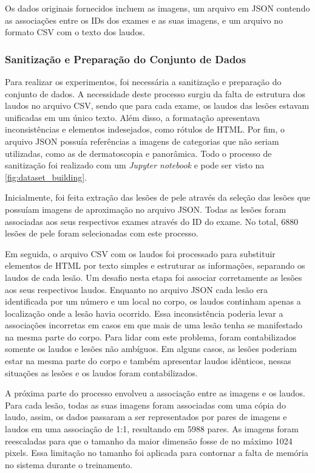 Os dados originais fornecidos incluem as imagens, um arquivo em \ac{JSON} contendo as associações entre os \acp{ID} dos
exames e as suas imagens, e um arquivo no formato \ac{CSV} com o texto dos laudos.

\subsubsection{Sanitização e Preparação do Conjunto de Dados}

Para realizar os experimentos, foi necessária a sanitização e preparação do conjunto de dados. A necessidade deste
processo surgiu da falta de estrutura dos laudos no arquivo \ac{CSV}, sendo que para cada exame, os laudos das
lesões estavam unificadas em um único texto. Além disso, a formatação apresentava inconsistências e elementos
indesejados, como rótulos de \ac{HTML}. Por fim, o arquivo \ac{JSON} possuía referências a imagens de categorias que
não seriam utilizadas, como as de dermatoscopia e panorâmica. Todo o processo de sanitização foi realizado com um
\textit{Jupyter notebook} e pode ser visto na \autoref{fig:dataset_building}.

Inicialmente, foi feita extração das lesões de pele através da seleção das lesões que possuíam imagens de aproximação
no arquivo \ac{JSON}. Todas as lesões foram associadas aos seus respectivos exames através do \ac{ID} do exame. No
total, 6880 lesões de pele foram selecionadas com este processo.

Em seguida, o arquivo \ac{CSV} com os laudos foi processado para substituir elementos de \ac{HTML} por texto simples e
estruturar as informações, separando os laudos de cada lesão. Um desafio nesta etapa foi associar corretamente
as lesões aos seus respectivos laudos. Enquanto no arquivo \ac{JSON} cada lesão era identificada por um número e
um local no corpo, os laudos continham apenas a localização onde a lesão havia ocorrido. Essa inconsistência poderia
levar a associações incorretas em casos em que mais de uma lesão tenha se manifestado na mesma parte do corpo. Para
lidar com este problema, foram contabilizados somente os laudos e lesões não ambíguos. Em alguns casos, as lesões
poderiam estar na mesma parte do corpo e também apresentar laudos idênticos, nessas situações as lesões e os laudos
foram contabilizados.

A próxima parte do processo envolveu a associação entre as imagens e os laudos. Para cada lesão, todas as suas imagens
foram associadas com uma cópia do laudo, assim, os dados passaram a ser representados por pares de imagens e laudos em
uma associação de 1:1, resultando em 5988 pares. As imagens foram reescaladas para que o tamanho da maior dimensão
fosse de no máximo 1024 pixels. Essa limitação no tamanho foi aplicada para contornar a falta de memória no sistema
durante o treinamento.

